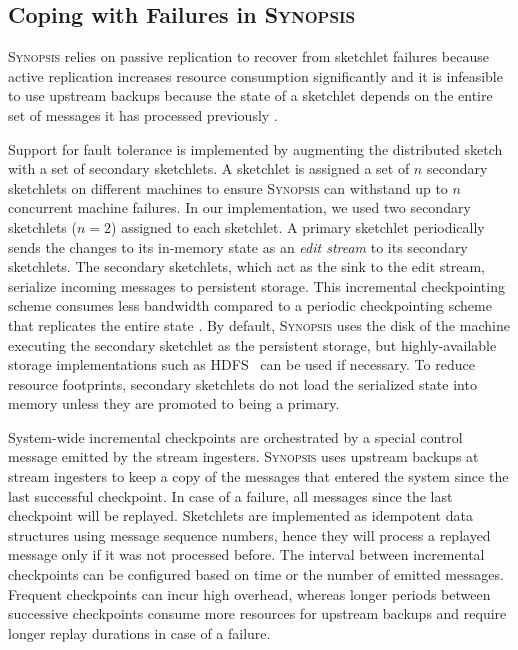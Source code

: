 \documentclass[9pt,journal,compsoc]{IEEEtran}
\begin{document}
\subsection{Coping with Failures in \textsc{Synopsis}}
\textsc{Synopsis} relies on passive replication to recover from sketchlet failures because active replication increases resource consumption significantly and it is infeasible to use upstream backups because the state of a sketchlet depends on the entire set of messages it has processed previously \cite{castro2013integrating}.

Support for fault tolerance is implemented by augmenting the distributed sketch with a set of secondary sketchlets.
A sketchlet is assigned a set of $n$ secondary sketchlets on different machines to ensure \textsc{Synopsis} can withstand up to $n$ concurrent machine failures.
In our implementation, we used two secondary sketchlets ($n=2$) assigned to each sketchlet.
A primary sketchlet periodically sends the changes to its in-memory state as an \emph{edit stream} to its secondary sketchlets.
The secondary sketchlets, which act as the sink to the edit stream, serialize incoming messages to persistent storage.
This incremental checkpointing scheme consumes less bandwidth compared to a periodic checkpointing scheme that replicates the entire state \cite{castro2013integrating}.
By default, \textsc{Synopsis} uses the disk of the machine executing the secondary sketchlet as the persistent storage, but highly-available storage implementations such as HDFS~\cite{borthakur2008hdfs} can be used if necessary.
To reduce resource footprints, secondary sketchlets do not load the serialized state into memory unless they are promoted to being a primary.

System-wide incremental checkpoints are orchestrated by a special control message emitted by the stream ingesters.
\textsc{Synopsis} uses upstream backups at stream ingesters to keep a copy of the messages that entered the system since the last successful checkpoint.
In case of a failure, all messages since the last checkpoint will be replayed.
Sketchlets are implemented as idempotent data structures using message sequence numbers, hence they will process a replayed message only if it was not processed before.
The interval between incremental checkpoints can be configured based on time or the number of emitted messages.
Frequent checkpoints can incur high overhead, whereas longer periods between successive checkpoints consume more resources for upstream backups and require longer replay durations in case of a failure.
\end{document}
